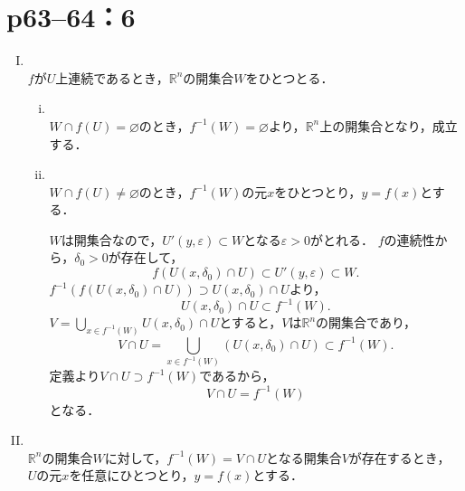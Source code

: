 \section*{p63--64：6} \label{p63--64：6}
\begin{tproof}
    \begin{enumerate}[(I)]
        \item \mbox{} \\
              $f$が$U$上連続であるとき，$\mathbb{R}^n$の開集合$W$をひとつとる．
              \begin{enumerate}[(i)]
                  \item \mbox{} \\
                        $W \cap f(U) = \varnothing$のとき，$f^{-1} (W) = \varnothing$より，$\mathbb{R}^n$上の開集合となり，成立する．
                  \item \mbox{} \\
                        $W \cap f(U) \ne \varnothing$のとき，$f^{-1} (W)$の元$x$をひとつとり，$y=f(x)$とする．

                        $W$は開集合なので，$U'(y,\varepsilon) \subset W$となる$\varepsilon >0$がとれる．
                        $f$の連続性から，$\delta_0 >0$が存在して，
                        \[
                            f(U(x,\delta_0) \cap U) \subset U'(y,\varepsilon) \subset W.
                        \]
                        $f^{-1} (f(U(x,\delta_0) \cap U)) \supset U(x,\delta_0) \cap U$より，
                        \[
                            U(x,\delta_0) \cap U \subset f^{-1} (W).
                        \]
                        $V = \bigcup_{x \in f^{-1}(W)} U(x,\delta_0) \cap U$とすると，$V$は$\mathbb{R}^n$の開集合であり，
                        \[
                            V \cap U = \bigcup_{x \in f^{-1}(W)} (U(x,\delta_0) \cap U)  \subset f^{-1} (W).
                        \]
                        定義より$V \cap U \supset f^{-1} (W)$であるから，
                        \[
                            V \cap U = f^{-1} (W)
                        \]
                        となる．
              \end{enumerate}
        \item \mbox{} \\
              $\mathbb{R}^n$の開集合$W$に対して，$f^{-1}(W)=V \cap U$となる開集合$V$が存在するとき，
              $U$の元$x$を任意にひとつとり，$y=f(x)$とする．


\end{enumerate}
\end{tproof}
